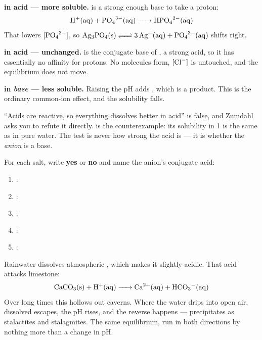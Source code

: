\documentclass{apchem-notes}
\begin{document}
\begin{workedexample}
\textbf{ in acid --- more soluble.}  is a strong
enough base to take a proton:
\[ \ce{H+(aq) + PO4^3-(aq) -> HPO4^2-(aq)} \]
That lowers $[\ce{PO4^3-}]$, so
$\ce{Ag3PO4(s) <=> 3Ag+(aq) + PO4^3-(aq)}$ shifts right.

\textbf{ in acid --- unchanged.}  is the conjugate base of
, a strong acid, so it has essentially no affinity for protons. No
 molecules form, $[\ce{Cl-}]$ is untouched, and the equilibrium does
not move.

\textbf{ in \emph{base} --- less soluble.} Raising the pH adds
, which is a product. This is the ordinary common-ion effect, and
the solubility falls.
\end{workedexample}

\begin{apctrap}
``Acids are reactive, so everything dissolves better in acid'' is false, and
Zumdahl asks you to refute it directly.  is the counterexample:
its solubility in \SI{1}{\Molar}  is the same as in pure water.
The test is never how strong the acid is --- it is whether the
\emph{anion} is a base.
\end{apctrap}


For each salt, write \textbf{yes} or \textbf{no} and name the anion's
conjugate acid:

\begin{enumerate}[leftmargin=*,itemsep=0.3em]
  \item {}: 
  \item {}: 
  \item {}: 
  \item {}: 
  \item {}: 
\end{enumerate}


Rainwater dissolves atmospheric , which makes it slightly acidic.
That acid attacks limestone:
\[ \ce{CaCO3(s) + H+(aq) -> Ca^2+(aq) + HCO3^-(aq)} \]
Over long times this hollows out caverns. Where the water drips into open
air, dissolved  escapes, the pH rises, and the reverse happens ---
 precipitates as stalactites and stalagmites. The same
equilibrium, run in both directions by nothing more than a change in pH.
\end{document}
